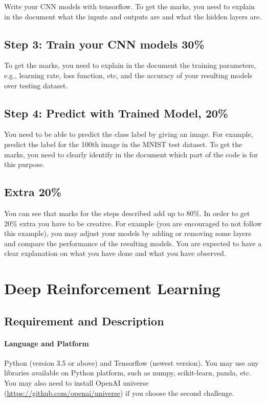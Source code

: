\documentclass[12pt,a4]{article}
\begin{document}
Write your CNN models with tensorflow. To get the marks, you need to explain in the document what the inputs and outputs are and what the hidden layers are. 

\subsection*{Step 3: Train your CNN models 30\%}

To get the marks, you need to explain in the document the training parameters, e.g., learning rate,  loss function, etc, and the accuracy of your resulting models over testing dataset. 


\subsection*{Step 4: Predict with Trained Model, 20\%}

You need to be able to predict the class label by giving an image. For example, predict the label for the 100th image in the MNIST test dataset. To get the marks, you need to clearly identify in the document which part of the code is for this purpose. 



\subsection{Extra 20\%}

You can see that marks for the steps described add up to 80\%. In order to get 20\% extra you have to be creative. For example (you are encouraged to not follow this example), you may adjust your models by adding or removing some layers and compare the performance of the resulting models. You are expected to have a clear explanation on what you have done and what you have observed.   



\section{Deep Reinforcement Learning} 

\subsection{Requirement and Description}

\paragraph{Language and Platform} Python (version 3.5 or above) and Tensorflow (newest version). You may use any libraries available on Python platform, such as numpy, scikit-learn, panda, etc. You may also need to install OpenAI universe (\url{https://github.com/openai/universe}) if you choose the second challenge. 
\end{document}
